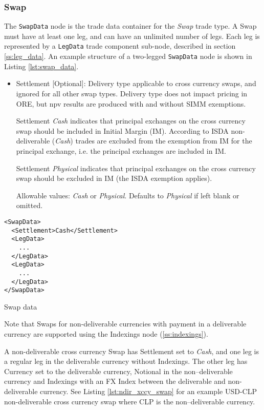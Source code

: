 \subsubsection{Swap}
\label{ss:swaptradetype} 

The \lstinline!SwapData! node is the trade data container for the \emph{Swap} trade type. A Swap must have at least one leg,
and can have an unlimited number of legs. Each leg is represented by a \lstinline!LegData! trade component sub-node,
described in section \ref{ss:leg_data}. An example structure of a two-legged \lstinline!SwapData!
node is shown in Listing \ref{lst:swap_data}.
\begin{itemize}
\item Settlement [Optional]: Delivery type applicable to cross currency swaps, and ignored for all other swap types. Delivery type does not impact pricing in ORE, but npv results are produced with and without SIMM exemptions.  

Settlement \emph{Cash} indicates that principal exchanges on the cross currency swap should be included in Initial Margin (IM). According to ISDA non-deliverable (\emph{Cash}) trades are excluded from the exemption from IM for the principal exchange, i.e. the principal exchanges are included in IM. 

Settlement \emph{Physical} indicates that principal exchanges on the cross currency swap should be excluded in IM (the ISDA exemption applies).  

Allowable values: \emph{Cash} or \emph{Physical}.  Defaults to \emph{Physical} if left blank or omitted.
\end{itemize}

\begin{listing}[H]
\begin{verbatim}
<SwapData>
  <Settlement>Cash</Settlement>
  <LegData>
    ...
  </LegData>
  <LegData>
    ...
  </LegData>
</SwapData>
\end{verbatim}
\caption{Swap data}
\label{lst:swap_data}
\end{listing}


Note that Swaps for non-deliverable currencies with payment in a deliverable currency are supported using the Indexings node (\ref{ss:indexings}). 

A non-deliverable cross currency Swap has Settlement set to \emph{Cash}, and one leg is a regular leg in the deliverable currency without Indexings. The other leg has Currency set to the deliverable currency, Notional in the non–deliverable currency and Indexings with an FX Index between the deliverable and non-deliverable currency. See Listing \ref{lst:ndir_xccy_swap} for an example USD-CLP non-deliverable cross currency swap where CLP is the non–deliverable currency.

